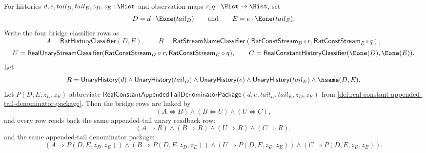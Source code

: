 \begin{theorem}
\label{thm:real-constant-appended-tail-rational-stream-bridge-readback}
For histories $d,e,tail_D,tail_E,z_D,z_E:\Hist$ and observation maps
$r,q:\Hist\to\Hist$, set
$$
D=d\cdot\Eone(tail_D)
\qquad\text{and}\qquad
E=e\cdot\Eone(tail_E).
$$
Write the four bridge classifier rows as
$$
A=\mathsf{RatHistoryClassifier}(D,E),
\qquad
B=\mathsf{RatStreamNameClassifier}(\mathsf{RatConstStream}_D\circ r,
\mathsf{RatConstStream}_E\circ q),
$$
$$
U=\mathsf{RealUnaryStreamClassifier}(\mathsf{RatConstStream}_D\circ r,
\mathsf{RatConstStream}_E\circ q),
\qquad
C=\mathsf{RealConstantHistoryClassifier}(\Eone(D),\Eone(E)).
$$
Let
$$
R=\mathsf{UnaryHistory}(d)\land\mathsf{UnaryHistory}(tail_D)\land
\mathsf{UnaryHistory}(e)\land\mathsf{UnaryHistory}(tail_E)\land
\hsame(D,E).
$$
Let $P(D,E,z_D,z_E)$ abbreviate
$\mathsf{RealConstantAppendedTailDenominatorPackage}
(d,e,tail_D,tail_E,z_D,z_E)$ from
\autoref{def:real-constant-appended-tail-denominator-package}.
Then the bridge rows are linked by
$$
(A\Longleftrightarrow B)\land(B\Longleftrightarrow U)\land
(U\Longleftrightarrow C),
$$
and every row reads back the same appended-tail unary readback row:
$$
(A\Longrightarrow R)\land(B\Longrightarrow R)\land
(U\Longrightarrow R)\land(C\Longrightarrow R),
$$
and the same appended-tail denominator package:
$$
(A\Longrightarrow P(D,E,z_D,z_E))\land
(B\Longrightarrow P(D,E,z_D,z_E))\land
(U\Longrightarrow P(D,E,z_D,z_E))\land
(C\Longrightarrow P(D,E,z_D,z_E)).
$$
\end{theorem}
